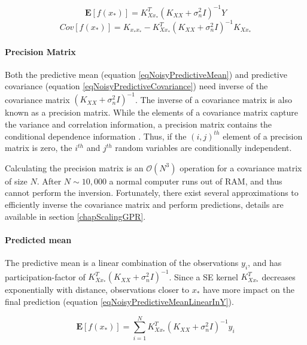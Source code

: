   \begin{equation}\label{eqNoisyPredictiveMean}
  \mathbf{E}[f(x_{*})] = K_{Xx_{*}}^{T}( K_{XX} + \sigma^{2}_{n}I)^{-1}Y
  \end{equation}
  \begin{equation}\label{eqNoisyPredictiveCovariance}
	Cov[f(x_{*})] = K_{x_{*}x_{*}} - K_{Xx_{*}}^{T}( K_{XX} + \sigma^{2}_{n}I )^{-1} K_{Xx_{*}}
  \end{equation}

\paragraph{Precision Matrix}  
Both the predictive mean (equation \ref{eqNoisyPredictiveMean}) and predictive covariance (equation \ref{eqNoisyPredictiveCovariance}) need inverse of the covariance matrix $( K_{XX} + \sigma^{2}_{n}I)^{-1}$. The inverse of a covariance matrix is also known as a precision matrix. While the elements of a covariance matrix capture the variance and correlation information, a precision matrix contains the conditional dependence information \cite{mackay2003information}. Thus, if the $(i, j)^{th}$ element of a precision matrix is zero, the $i^{th}$ and $j^{th}$ random variables are conditionally independent. 

Calculating the precision matrix is an $\mathcal{O}\left ( N^{3} \right )$ operation for a covariance matrix of size $N$. After $N \sim 10,000$ a normal computer runs out of RAM, and thus cannot perform the inversion. Fortunately, there exist several approximations to efficiently inverse the covariance matrix and perform predictions, details are available in section \ref{chapScalingGPR}.

\paragraph{Predicted mean}
The predictive mean is a linear combination of the observations $y_{i}$, and has participation-factor of $K_{Xx_{*}}^{T}( K_{XX} + \sigma^{2}_{n}I)^{-1}$. Since a SE kernel $K_{Xx_{*}}^{T}$ decreases exponentially with distance, observations closer to $x_{*}$ have more impact on the final prediction (equation \ref{eqNoisyPredictiveMeanLinearInY}). 
  
  \begin{equation}\label{eqNoisyPredictiveMeanLinearInY}
  \mathbf{E}[f(x_{*})] = \sum_{i = 1}^{N} K_{Xx_{*}}^{T}( K_{XX} + \sigma^{2}_{n}I)^{-1}y_{i}
  \end{equation}

